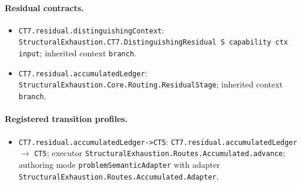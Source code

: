 \paragraph{Residual contracts.}
\begin{itemize}
\item \texttt{CT7.\allowbreak{}residual.\allowbreak{}distingu\allowbreak{}ishing\allowbreak{}Context}: \texttt{Structural\allowbreak{}Exhaustion.\allowbreak{}CT7.\allowbreak{}Distingui\allowbreak{}shing\allowbreak{}Residual S capability ctx input}; inherited context \texttt{branch}.
\item \texttt{CT7.\allowbreak{}residual.\allowbreak{}accumulated\allowbreak{}Ledger}: \texttt{Structural\allowbreak{}Exhaustion.\allowbreak{}Core.\allowbreak{}Routing.\allowbreak{}Residual\allowbreak{}Stage}; inherited context \texttt{branch}.
\end{itemize}
\paragraph{Registered transition profiles.}
\begin{itemize}
\item \texttt{CT7.\allowbreak{}residual.\allowbreak{}accumulated\allowbreak{}Ledger-\allowbreak{}>CT5}: \texttt{CT7.\allowbreak{}residual.\allowbreak{}accumulated\allowbreak{}Ledger} $\to$ \texttt{CT5}; executor \texttt{Structural\allowbreak{}Exhaustion.\allowbreak{}Routes.\allowbreak{}Accumulated.\allowbreak{}advance}; authoring mode \texttt{problem\allowbreak{}Semantic\allowbreak{}Adapter} with adapter \texttt{Structural\allowbreak{}Exhaustion.\allowbreak{}Routes.\allowbreak{}Accumulated.\allowbreak{}Adapter}.
\end{itemize}
\endgroup
